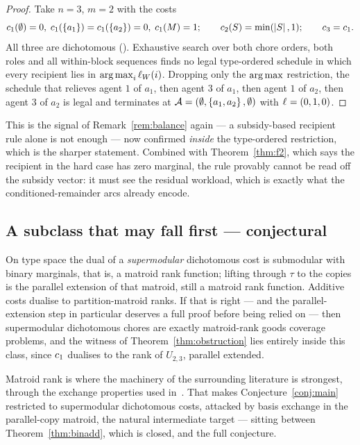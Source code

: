 \begin{proof}
Take $n = 3$, $m = 2$ with the costs
\[
  c_1(\emptyset) = 0,\; c_1(\left\{a_1\right\}) = c_1(\left\{a_2\right\}) = 0,\;
  c_1(M) = 1; \qquad
  c_2(S) = \min(\left\lvert S\right\rvert,1); \qquad c_3 = c_1 .
\]
All three are dichotomous (). Exhaustive search over
both chore orders, both roles and all within-block sequences finds no legal
type-ordered schedule in which every recipient lies in
$\operatorname*{arg\,max}_i \ell_{W}(i)$. Dropping only the $\operatorname*{arg\,max}$ restriction,
the schedule that relieves agent $1$ of $a_1$, then agent $3$ of $a_1$, then
agent $1$ of $a_2$, then agent $3$ of $a_2$ is legal and terminates at
$\mathcal{A} = (\emptyset, \left\{a_1,a_2\right\}, \emptyset)$ with $\ell_{} = (0,1,0)$.
\end{proof}

This is the signal of Remark~\ref{rem:balance} again --- a subsidy-based
recipient rule alone is not enough --- now confirmed \emph{inside} the
type-ordered restriction, which is the sharper statement. Combined with
Theorem~\ref{thm:f2}, which says the recipient in the hard case has zero
marginal, the rule provably cannot be read off the subsidy vector: it must see
the residual workload, which is exactly what the conditioned-remainder arcs
already encode.

\subsection{A subclass that may fall first --- conjectural}
\label{sec:mrf}

On type space the dual of a \emph{supermodular} dichotomous cost is submodular
with binary marginals, that is, a matroid rank function; lifting through $\tau$
to the copies is the parallel extension of that matroid, still a matroid rank
function. Additive costs dualise to partition-matroid ranks. If that is right
--- and the parallel-extension step in particular deserves a full proof before
being relied on --- then supermodular dichotomous chores are exactly
matroid-rank goods coverage problems, and the witness of
Theorem~\ref{thm:obstruction} lies entirely inside this class, since $c_1$
dualises to the rank of $U_{2,3}$, parallel extended.

Matroid rank is where the machinery of the surrounding literature is strongest,
through the exchange properties used in~\cite{BSY23,BEF21}. That makes
Conjecture~\ref{conj:main} restricted to supermodular dichotomous costs, attacked
by basis exchange in the parallel-copy matroid, the natural intermediate target
--- sitting between Theorem~\ref{thm:binadd}, which is closed, and the full
conjecture.
